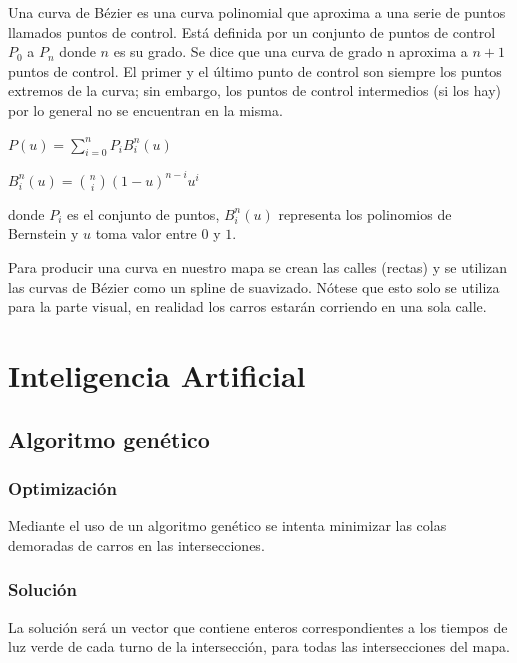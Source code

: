 \documentclass[colorinlistoftodos,twoside,twocolumn]{article} %
\begin{document}
	Una curva de Bézier es una curva polinomial que aproxima a una serie de puntos llamados puntos de control. Est\'a definida por un conjunto de puntos de control $ P_{0} $ a $ P_{n} $ donde $ n $ es su grado. Se dice que una curva de grado n aproxima a $ n + 1 $ puntos de control. El primer y el último punto de control son siempre los puntos extremos de la curva; sin embargo, los puntos de control intermedios (si los hay) por lo general no se encuentran en la misma. 
	
	\begin{center}
		$ P(u) = \sum_{i=0}^{n} P_{i}B_{i}^{n}(u) $
	\end{center}
	\begin{center}
		$ B_{i}^{n}(u) = \binom{n}{i} (1 - u)^{n-i}u^{i} $
	\end{center}
	donde $ P_{i} $ es el conjunto de puntos, $ B_{i}^{n}(u) $ representa los polinomios de Bernstein y $ u $ toma valor entre $ 0 $ y $ 1 $.

	Para producir una curva en nuestro mapa se crean las calles (rectas) y se utilizan las curvas de B\'ezier como un spline de suavizado. N\'otese que esto solo se utiliza para la parte visual, en realidad los carros estar\'an corriendo en una sola calle. 
	
	\section{Inteligencia Artificial}
	
	\subsection{Algoritmo genético}
	
	\subsubsection{Optimizaci\'on}
	
	Mediante el uso de un algoritmo gen\'etico se intenta minimizar las colas demoradas de carros en las intersecciones.
	
	\subsubsection{Solución}
	
	La solución será un vector que contiene enteros correspondientes a los tiempos de luz verde de cada turno de la intersección, para todas las intersecciones del mapa.
	
\end{document}
